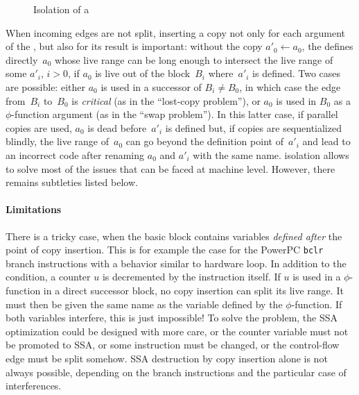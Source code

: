 \begin{figure}[h]
  \hfill
{}\hfill
{}
\hfill\strut
\caption{Isolation of a \phinode\label{fig:phi_isolation}}
\end{figure}


When incoming edges are not split, inserting a copy not only for each argument of the \phifun, but also for its result is important: 
without the copy $a'_0\gets a_0$, the \phifun defines directly~$a_0$ whose live range can be long enough to intersect the live range of some $a'_i$, $i>0$, if $a_0$ is live out of the block~$B_i$ where~$a'_i$ is defined. 
Two cases are possible: 
either $a_0$ is used in a successor of $B_i \neq B_0$, in which case the edge from~$B_i$ to~$B_0$ is \emph{critical} (as in the ``lost-copy problem''), or $a_0$ is used in $B_0$ as a $\phi$-function argument (as in the ``swap problem''). 
In this latter case, if parallel copies are used, $a_0$ is dead before~$a'_i$ is defined but, if copies are sequentialized blindly, the live range of~$a_0$ can go beyond the definition point of~$a'_i$ and lead to an incorrect code after renaming $a_0$ and $a'_i$ with the same name. 
\phinode isolation allows to solve most of the issues that can be faced at machine level. 
However, there remains subtleties listed below.



\paragraph{Limitations}
There is a tricky case, when the basic block contains variables \emph{defined after} the point of copy insertion. 
This is for example the case for the PowerPC \texttt{bclr} branch instructions with a behavior similar to hardware loop. 
In addition to the condition, a counter $u$ is decremented by the instruction itself. 
If $u$ is used in a $\phi$-function in a direct successor block, no copy insertion can split its live range. 
It must then be given the same name as the variable defined by the $\phi$-function. 
If both variables interfere, this is just impossible! 
To solve the problem, the SSA optimization could be designed with more care, or the counter variable must not be promoted to SSA, or some instruction must be changed, or the control-flow edge must be split somehow. 
SSA destruction by copy insertion alone is not always possible, depending on the branch instructions and the particular case of interferences.

